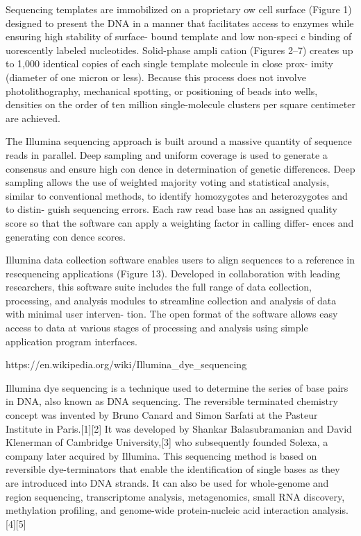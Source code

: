 Sequencing templates are immobilized on a proprietary  ow cell surface (Figure 1) designed to present the DNA in a manner that facilitates access to enzymes while ensuring high stability of surface- bound template and low non-speci c binding of  uorescently labeled nucleotides. Solid-phase ampli cation (Figures 2–7) creates up to 1,000 identical copies of each single template molecule in close prox- imity (diameter of one micron or less). Because this process does not involve photolithography, mechanical spotting, or positioning of beads into wells, densities on the order of ten million single-molecule clusters per square centimeter are achieved.

The Illumina sequencing approach is built around a massive quantity of sequence reads in parallel. Deep sampling and uniform coverage is used to generate a consensus and ensure high con dence in determination of genetic differences. Deep sampling allows the use of weighted majority voting and statistical analysis, similar to conventional methods, to identify homozygotes and heterozygotes and to distin- guish sequencing errors. Each raw read base has an assigned quality score so that the software can apply a weighting factor in calling differ- ences and generating con dence scores.

Illumina data collection software enables users to align sequences to a reference in resequencing applications (Figure 13). Developed in collaboration with leading researchers, this software suite includes the full range of data collection, processing, and analysis modules to streamline collection and analysis of data with minimal user interven- tion. The open format of the software allows easy access to data at various stages of processing and analysis using simple application program interfaces.

https://en.wikipedia.org/wiki/Illumina_dye_sequencing

Illumina dye sequencing is a technique used to determine the series of base pairs in DNA, also known as DNA sequencing. The reversible terminated chemistry concept was invented by Bruno Canard and Simon Sarfati at the Pasteur Institute in Paris.[1][2] It was developed by Shankar Balasubramanian and David Klenerman of Cambridge University,[3] who subsequently founded Solexa, a company later acquired by Illumina. This sequencing method is based on reversible dye-terminators that enable the identification of single bases as they are introduced into DNA strands. It can also be used for whole-genome and region sequencing, transcriptome analysis, metagenomics, small RNA discovery, methylation profiling, and genome-wide protein-nucleic acid interaction analysis.[4][5]

